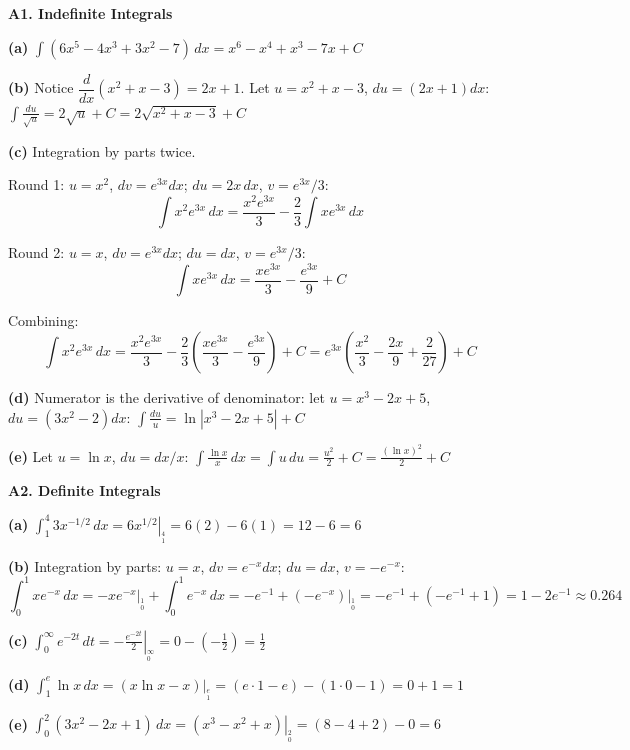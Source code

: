 \documentclass[12pt, a4paper]{article}
\theoremstyle{definition}
\newcommand{\dd}[1]{\,d#1}
\newcommand{\eval}[2]{\left.#1\right|_{#2}}
\begin{document}
\begin{solbox}
\textbf{A1. Indefinite Integrals}

\textbf{(a)}
$\displaystyle\int(6x^5-4x^3+3x^2-7)\dd{x}
= x^6 - x^4 + x^3 - 7x + C$

\textbf{(b)} Notice $\dfrac{d}{dx}(x^2+x-3)=2x+1$. Let $u=x^2+x-3$, $du=(2x+1)dx$:
$\displaystyle\int\frac{du}{\sqrt{u}} = 2\sqrt{u}+C = 2\sqrt{x^2+x-3}+C$

\textbf{(c)} Integration by parts twice.

Round 1: $u=x^2$, $dv=e^{3x}dx$; $du=2x\,dx$, $v=e^{3x}/3$:
\[
  \int x^2e^{3x}\dd{x} = \frac{x^2e^{3x}}{3} - \frac{2}{3}\int xe^{3x}\dd{x}
\]

Round 2: $u=x$, $dv=e^{3x}dx$; $du=dx$, $v=e^{3x}/3$:
\[
  \int xe^{3x}\dd{x} = \frac{xe^{3x}}{3} - \frac{e^{3x}}{9} + C
\]

Combining:
\[
  \int x^2e^{3x}\dd{x}
  = \frac{x^2e^{3x}}{3} - \frac{2}{3}\!\left(\frac{xe^{3x}}{3}-\frac{e^{3x}}{9}\right)+C
  = e^{3x}\!\left(\frac{x^2}{3}-\frac{2x}{9}+\frac{2}{27}\right)+C
\]

\textbf{(d)} Numerator is the derivative of denominator: let $u=x^3-2x+5$, $du=(3x^2-2)dx$:
$\displaystyle\int\frac{du}{u} = \ln|x^3-2x+5|+C$

\textbf{(e)} Let $u=\ln x$, $du=dx/x$:
$\displaystyle\int\frac{\ln x}{x}\dd{x} = \int u\,du = \frac{u^2}{2}+C = \frac{(\ln x)^2}{2}+C$
\end{solbox}

\begin{solbox}
\textbf{A2. Definite Integrals}

\textbf{(a)} $\displaystyle\int_1^4 3x^{-1/2}\dd{x}
= \eval{6x^{1/2}}{_1^4} = 6(2)-6(1) = 12-6 = 6$

\textbf{(b)} Integration by parts: $u=x$, $dv=e^{-x}dx$; $du=dx$, $v=-e^{-x}$:
\[
  \int_0^1 xe^{-x}\dd{x}
  = \eval{-xe^{-x}}{_0^1}+\int_0^1 e^{-x}\dd{x}
  = -e^{-1}+\eval{(-e^{-x})}{_0^1}
  = -e^{-1}+(-e^{-1}+1)
  = 1-2e^{-1}\approx 0.264
\]

\textbf{(c)} $\displaystyle\int_0^\infty e^{-2t}\dd{t}
= \eval{-\frac{e^{-2t}}{2}}{_0^\infty}
= 0-\left(-\frac{1}{2}\right) = \frac{1}{2}$

\textbf{(d)} $\displaystyle\int_1^e \ln x\dd{x}
= \eval{(x\ln x-x)}{_1^e}
= (e\cdot 1-e)-(1\cdot 0-1) = 0+1 = 1$

\textbf{(e)} $\displaystyle\int_0^2(3x^2-2x+1)\dd{x}
= \eval{(x^3-x^2+x)}{_0^2}
= (8-4+2)-0 = 6$
\end{solbox}
\end{document}
